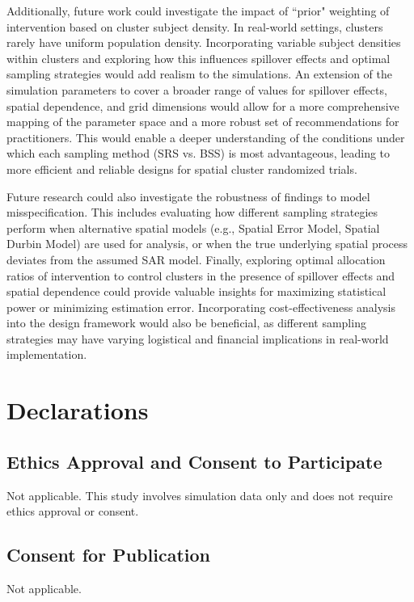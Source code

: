 \documentclass{article}[11pt]
\begin{document}
Additionally, future work could investigate the impact of ``prior" weighting of intervention
based on cluster subject density. In real-world settings, clusters rarely have uniform
population density. Incorporating variable subject densities within clusters and exploring how
this influences spillover effects and optimal sampling strategies would add realism to the
simulations. An extension of the simulation parameters to cover a broader range of values for spillover
effects, spatial dependence, and grid dimensions would allow for a more comprehensive mapping of the
parameter space and a more robust set of recommendations for practitioners. This would
enable a deeper understanding of the conditions under which each sampling method (SRS vs.
BSS) is most advantageous, leading to more efficient and reliable designs for spatial cluster
randomized trials.

Future research could also investigate the robustness of findings to model
misspecification. This includes evaluating how different sampling strategies perform when
alternative spatial models (e.g., Spatial Error Model, Spatial Durbin Model) are used for
analysis, or when the true underlying spatial process deviates from the assumed SAR model. Finally, exploring optimal allocation ratios of intervention to control clusters in the presence of spillover effects and spatial dependence could provide valuable insights for maximizing statistical power or minimizing estimation error. Incorporating cost-effectiveness analysis into the design framework would also be beneficial, as different sampling strategies may have varying logistical and financial implications in real-world implementation.

\section*{Declarations}

\subsection*{Ethics Approval and Consent to Participate}
Not applicable. This study involves simulation data only and does not require ethics approval or consent.

\subsection*{Consent for Publication}
Not applicable.
\end{document}
